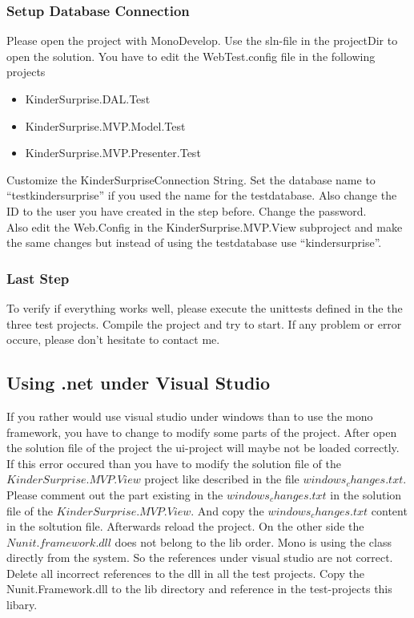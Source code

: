 \documentclass{article}
\begin{document}
\subsubsection{Setup Database Connection}
Please open the project with MonoDevelop. Use the sln-file in the projectDir to
open the solution.
You have to edit the WebTest.config file in the following projects
\begin{itemize}
  \item KinderSurprise.DAL.Test
  \item KinderSurprise.MVP.Model.Test
  \item KinderSurprise.MVP.Presenter.Test
\end{itemize}
Customize the KinderSurpriseConnection String. Set the database name to
``testkindersurprise'' if you used the name for the testdatabase. Also change
the ID to the user you have created in the step before. Change the password.\\

Also edit the Web.Config in the KinderSurprise.MVP.View subproject and make the
same changes but instead of using the testdatabase use ``kindersurprise''.

\subsubsection{Last Step}
To verify if everything works well, please execute the unittests defined in the
the three test projects.
Compile the project and try to start.
If any problem or error occure, please don't hesitate to contact me.

\subsection{Using .net under Visual Studio}
If you rather would use visual studio under windows than to use the mono
framework, you have to change to modify some parts of the project.
After open the solution file of the project the ui-project will maybe not be
loaded correctly. If this error occured than you have to modify the solution
file of the $KinderSurprise.MVP.View$ project like described in the file
$windows_changes.txt$.
Please comment out the part existing in the $windows_changes.txt$ in the
solution file of the $KinderSurprise.MVP.View$. And copy the
$windows_changes.txt$ content in the soltution file.
Afterwards reload the project.
\newline
On the other side the $Nunit.framework.dll$ does not belong to the lib order.
Mono is using the class directly from the system. So the references under visual
studio are not correct. Delete all incorrect references to the dll in all the
test projects. Copy the Nunit.Framework.dll to the lib directory and
reference in the test-projects this libary.
\end{document}
